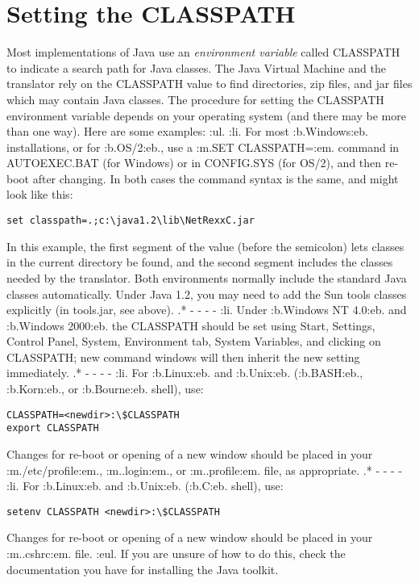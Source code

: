 \chapter{Setting the CLASSPATH}
Most implementations of Java use an \emph{environment variable} called
CLASSPATH to indicate a search path for Java classes.  The Java Virtual
Machine and the \nr{} translator rely on the CLASSPATH value to find
directories, zip files, and jar files which may contain Java classes.
\newline
The procedure for setting the CLASSPATH environment variable depends on
your operating system (and there may be more than one way).  Here are
some examples:
:ul.
:li.
For most :b.Windows:eb. installations, or for :b.OS/2:eb., use a :m.SET
CLASSPATH=:em. command in AUTOEXEC.BAT (for Windows) or in CONFIG.SYS
(for OS/2), and then re-boot after changing.  In both cases the command
syntax is the same, and might look like this:
\begin{verbatim}
set classpath=.;c:\java1.2\lib\NetRexxC.jar
\end{verbatim}
In this example, the first segment of the value (before the semicolon)
lets classes in the current directory be found, and the second segment
includes the classes needed by the \nr{} translator.  Both
environments normally include the standard Java classes automatically.
Under Java 1.2, you may need to add the Sun tools classes explicitly (in
tools.jar, see above).
.* - - - -
:li.
Under :b.Windows NT 4.0:eb. and :b.Windows 2000:eb. the CLASSPATH should
be set using Start, Settings, Control Panel, System, Environment tab,
System Variables, and clicking on CLASSPATH; new command windows will
then inherit the new setting immediately.
.* - - - -
:li.
For :b.Linux:eb. and :b.Unix:eb. (:b.BASH:eb., :b.Korn:eb., or
:b.Bourne:eb. shell), use:
\begin{verbatim}
CLASSPATH=<newdir>:\$CLASSPATH
export CLASSPATH
\end{verbatim}
Changes for re-boot or opening of a new window should be placed
in your :m./etc/profile:em., :m..login:em., or :m..profile:em. file, as
appropriate.
.* - - - -
:li.
For :b.Linux:eb. and :b.Unix:eb.
(:b.C:eb. shell), use:
\begin{verbatim}
setenv CLASSPATH <newdir>:\$CLASSPATH
\end{verbatim}
Changes for re-boot or opening of a new window should be
placed in your :m..cshrc:em. file.
:eul.
\newline
If you are unsure of how to do this, check the documentation you have
for installing the Java toolkit.
